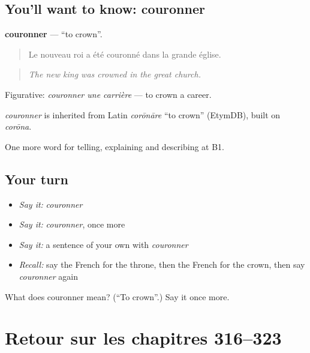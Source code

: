 \subsection*{You'll want to know: couronner}
\textbf{couronner} — \textquotedblleft{}to crown\textquotedblright{}.

\begin{quote}
Le nouveau roi a été couronné dans la grande église.
\end{quote}

\begin{quote}
\emph{The new king was crowned in the great church.}
\end{quote}

Figurative: \emph{couronner une carrière} — to crown a career.

\begin{cousinweb}
\emph{couronner} is inherited from Latin \emph{corōnāre} \textquotedblleft{}to crown\textquotedblright{} (EtymDB), built on \emph{corōna}.
\end{cousinweb}

\begin{grammarlens}[title={What you've built}]
One more word for telling, explaining and describing at B1.
\end{grammarlens}

\subsection*{Your turn}
\begin{itemize}
\raggedright
  \item \emph{Say it:} \emph{couronner}
  \item \emph{Say it:} \emph{couronner}, once more
  \item \emph{Say it:} a sentence of your own with \emph{couronner}
  \item \emph{Recall:} say the French for the throne, then the French for the crown, then say \emph{couronner} again
\end{itemize}

\begin{tcolorbox}[breakable,colback=teal!4,colframe=teal!35!black,title={Before you move on}]
What does couronner mean? (\textquotedblleft{}To crown\textquotedblright{}.) Say it once more.
\end{tcolorbox}
\section[(dialogue)]{Retour sur les chapitres 316–323}

